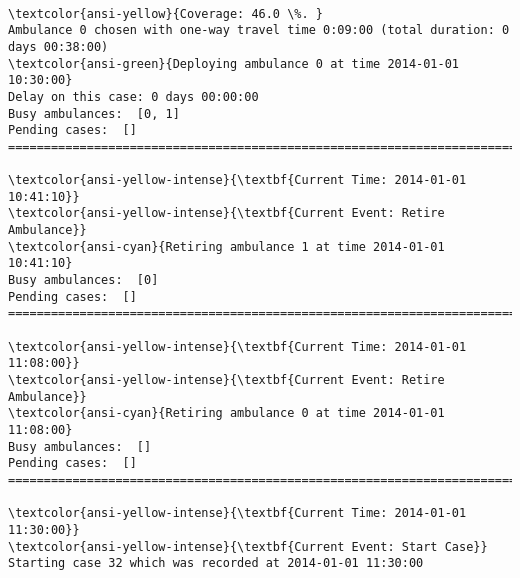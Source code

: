 \documentclass[11pt]{article}
\begin{document}
    \begin{center}
    \end{center}
    { \hspace*{\fill} \\}
    
    \begin{Verbatim}[commandchars=\\\{\}]
\textcolor{ansi-yellow}{Coverage: 46.0 \%. }
Ambulance 0 chosen with one-way travel time 0:09:00 (total duration: 0 days 00:38:00)
\textcolor{ansi-green}{Deploying ambulance 0 at time 2014-01-01 10:30:00}
Delay on this case: 0 days 00:00:00
Busy ambulances:  [0, 1]
Pending cases:  []
========================================================================

\textcolor{ansi-yellow-intense}{\textbf{Current Time: 2014-01-01 10:41:10}}
\textcolor{ansi-yellow-intense}{\textbf{Current Event: Retire Ambulance}}
\textcolor{ansi-cyan}{Retiring ambulance 1 at time 2014-01-01 10:41:10}
Busy ambulances:  [0]
Pending cases:  []
========================================================================

\textcolor{ansi-yellow-intense}{\textbf{Current Time: 2014-01-01 11:08:00}}
\textcolor{ansi-yellow-intense}{\textbf{Current Event: Retire Ambulance}}
\textcolor{ansi-cyan}{Retiring ambulance 0 at time 2014-01-01 11:08:00}
Busy ambulances:  []
Pending cases:  []
========================================================================

\textcolor{ansi-yellow-intense}{\textbf{Current Time: 2014-01-01 11:30:00}}
\textcolor{ansi-yellow-intense}{\textbf{Current Event: Start Case}}
Starting case 32 which was recorded at 2014-01-01 11:30:00

    \end{Verbatim}

    \begin{center}
    \end{center}
    { \hspace*{\fill} \\}
    
\end{document}

